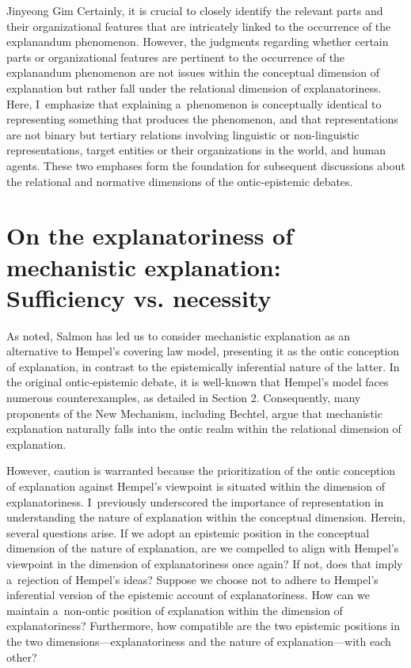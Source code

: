 \begin{artengenv}{Jinyeong Gim}
Certainly, it is crucial to closely identify the relevant parts and their organizational features that are intricately linked to the occurrence of the explanandum phenomenon. However, the judgments regarding whether certain parts or organizational features are pertinent to the occurrence of the explanandum phenomenon are not issues within the conceptual dimension of explanation but rather fall under the relational dimension of explanatoriness. Here, I~emphasize that explaining a~phenomenon is conceptually identical to representing something that produces the phenomenon, and that representations are not binary but tertiary relations involving linguistic or non-linguistic representations, target entities or their organizations in the world, and human agents. These two emphases form the foundation for subsequent discussions about the relational and normative dimensions of the ontic-epistemic debates.

\section{On the explanatoriness of mechanistic explanation: Sufficiency vs. necessity}
As noted, Salmon has led us to consider mechanistic explanation as an alternative to Hempel's covering law model, presenting it as the ontic conception of explanation, in contrast to the epistemically inferential nature of the latter. In the original ontic-epistemic debate, it is well-known that Hempel's model faces numerous counterexamples, as detailed in Section 2. Consequently, many proponents of the New Mechanism, including Bechtel, argue that mechanistic explanation naturally falls into the ontic realm within the relational dimension of explanation.

However, caution is warranted because the prioritization of the ontic conception of explanation against Hempel's viewpoint is situated within the dimension of explanatoriness. I~previously underscored the importance of representation in understanding the nature of explanation within the conceptual dimension. Herein, several questions arise. If we adopt an epistemic position in the conceptual dimension of the nature of explanation, are we compelled to align with Hempel's viewpoint in the dimension of explanatoriness once again? If not, does that imply a~rejection of Hempel's ideas? Suppose we choose not to adhere to Hempel's inferential version of the epistemic account of explanatoriness. How can we maintain a~non-ontic position of explanation within the dimension of explanatoriness? Furthermore, how compatible are the two epistemic positions in the two dimensions---explanatoriness and the nature of explanation---with each other?


\end{artengenv}
